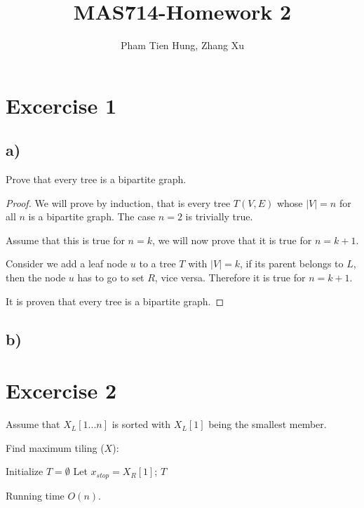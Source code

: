 \documentclass[a4paper,10pt,twoside]{article}
\title{MAS714-Homework 2}
\author{Pham Tien Hung, Zhang Xu
}
\date{}
\newtheorem{proof}{Proof}
\newcommand{\TODO}[1]{\noindent {\color{red} \{{\bf To-do:} #1\}}}
\begin{document}
\maketitle
\section*{Excercise 1}
\subsection*{a)}
Prove that every tree is a bipartite graph.
\begin{proof}
	We will prove by induction, that is every tree $T(V, E)$ whose
	$|V| = n$ for all $n$ is a bipartite graph. The case $n=2$ is trivially true.

	Assume that this is true for $n = k$, we will now prove that it
	is true for $n = k + 1$. 

	Consider we add a leaf node $u$ to a tree $T$ with $|V| = k$, 
	if its parent belongs to $L$, then the node $u$ has to go to set $R$, vice versa. 
	Therefore it is true for $n = k + 1$.

	It is proven that every tree is a bipartite graph.
		
\end{proof}

\subsection*{b)}


	\TODO{}

\section*{Excercise 2}

Assume that $X_L[1...n]$ is sorted with $X_L[1]$ being the smallest member.

\begin{algorithm}[h]
\caption{Find maximum tiling ($X$):}
	Initialize $T = \emptyset$\;
	Let $x_{stop} = X_R[1]$;
	\Return $T$\;
\end{algorithm}
Running time $O(n)$.
\end{document}
